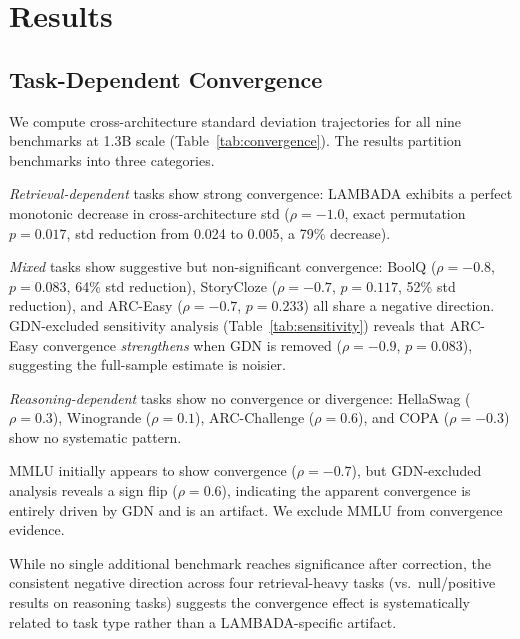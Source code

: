 \documentclass[11pt,twocolumn]{article}
\begin{document}
\section{Results}

\subsection{Task-Dependent Convergence}\label{sec:task-convergence}

We compute cross-architecture standard deviation trajectories for all nine benchmarks at 1.3B scale (Table~\ref{tab:convergence}).
The results partition benchmarks into three categories.

\emph{Retrieval-dependent} tasks show strong convergence: LAMBADA exhibits a perfect monotonic decrease in cross-architecture std ($\rho{=}{-}1.0$, exact permutation $p{=}0.017$, std reduction from 0.024 to 0.005, a 79\% decrease).

\emph{Mixed} tasks show suggestive but non-significant convergence:
BoolQ ($\rho{=}{-}0.8$, $p{=}0.083$, 64\% std reduction), StoryCloze ($\rho{=}{-}0.7$, $p{=}0.117$, 52\% std reduction), and ARC-Easy ($\rho{=}{-}0.7$, $p{=}0.233$) all share a negative direction.
GDN-excluded sensitivity analysis (Table~\ref{tab:sensitivity}) reveals that ARC-Easy convergence \emph{strengthens} when GDN is removed ($\rho{=}{-}0.9$, $p{=}0.083$), suggesting the full-sample estimate is noisier.

\emph{Reasoning-dependent} tasks show no convergence or divergence: HellaSwag ($\rho{=}0.3$), Winogrande ($\rho{=}0.1$), ARC-Challenge ($\rho{=}0.6$), and COPA ($\rho{=}{-}0.3$) show no systematic pattern.

MMLU initially appears to show convergence ($\rho{=}{-}0.7$), but GDN-excluded analysis reveals a sign flip ($\rho{=}0.6$), indicating the apparent convergence is entirely driven by GDN and is an artifact.
We exclude MMLU from convergence evidence.

While no single additional benchmark reaches significance after correction, the consistent negative direction across four retrieval-heavy tasks (vs.\ null/positive results on reasoning tasks) suggests the convergence effect is systematically related to task type rather than a LAMBADA-specific artifact.
\end{document}
